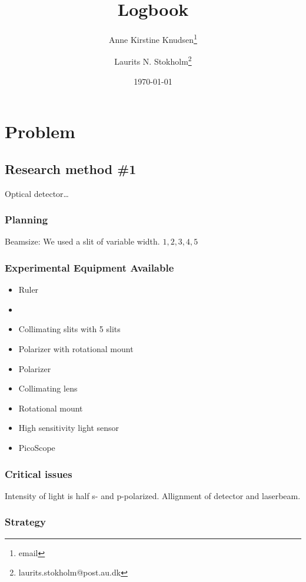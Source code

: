 \documentclass[a4paper, oneside, onecolumn, 11pt]{memoir}
\title{Logbook}
\author{Anne Kirstine Knudsen\thanks{email} \and Laurits N. Stokholm\thanks{laurits.stokholm@post.au.dk}}
\date{\today}
\begin{document}
\maketitle
\section{Problem}


\subsection{Research method \#1}
Optical detector\ldots
\subsubsection{Planning}


Beamsize: We used a slit of variable width. $1, 2, 3, 4, 5$

\subsubsection{Experimental Equipment Available}
\begin{itemize}
    \item Ruler
    \item %
    \item Collimating slits with 5 slits
    \item Polarizer with rotational mount
    \item Polarizer
    \item Collimating lens
    \item Rotational mount
    \item High sensitivity light sensor
    \item PicoScope
\end{itemize}

\subsubsection{Critical issues}
Intensity of light is half s- and p-polarized.
Allignment of detector and laserbeam.

\subsubsection{Strategy}
\end{document}
